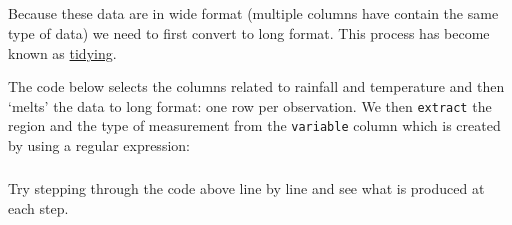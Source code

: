 \documentclass[]{article}
\newenvironment{Shaded}{\begin{snugshade}}{\end{snugshade}}
\newcommand{\KeywordTok}[1]{\textcolor[rgb]{0.13,0.29,0.53}{\textbf{#1}}}
\newcommand{\DataTypeTok}[1]{\textcolor[rgb]{0.13,0.29,0.53}{#1}}
\newcommand{\CharTok}[1]{\textcolor[rgb]{0.31,0.60,0.02}{#1}}
\newcommand{\StringTok}[1]{\textcolor[rgb]{0.31,0.60,0.02}{#1}}
\newcommand{\OperatorTok}[1]{\textcolor[rgb]{0.81,0.36,0.00}{\textbf{#1}}}
\newcommand{\NormalTok}[1]{#1}
\let\oldsubparagraph\subparagraph
\renewcommand{\subparagraph}[1]{\oldsubparagraph{#1}\mbox{}}
\theoremstyle{definition}
\theoremstyle{definition}
\theoremstyle{definition}
\theoremstyle{remark}
\begin{document}
\hypertarget{extract-to-split-column-names}{\subparagraph{}\label{extract-to-split-column-names}}

Because these data are in wide format (multiple columns have contain the
same type of data) we need to first convert to long format. This process
has become known as \href{http://tidyr.tidyverse.org}{tidying}.

The code below selects the columns related to rainfall and temperature
and then `melts' the data to long format: one row per observation. We
then \texttt{extract} the region and the type of measurement from the
\texttt{variable} column which is created by using a regular expression:

\begin{Shaded}
\end{Shaded}

\subparagraph{}\label{section-12}

Try stepping through the code above line by line and see what is
produced at each step.
\end{document}
